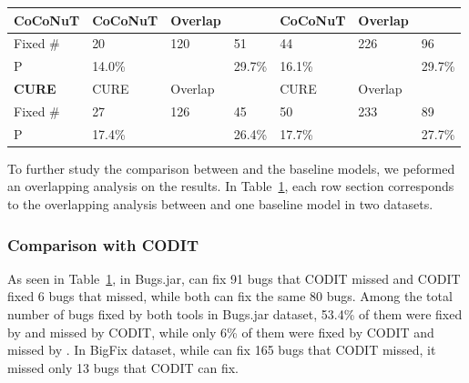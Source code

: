 {{\begin{table}[t]
\begin{center}
\begin{tabular}{p{1cm}<{\centering}|p{1.1cm}<{\centering}|p{0.8cm}<{\centering}|p{0.7cm}<{\centering}|p{1.1cm}<{\centering}|p{0.8cm}<{\centering}|p{0.7cm}<{\centering}}
			\hline
			{\bf CoCoNuT}             & CoCoNuT   & Overlap   & \tool  & CoCoNuT   & Overlap   & \tool \\
			\hline
			Fixed \#     & \cellcolor{mygray} 20  & 120   & \cellcolor{mygray} 51 & \cellcolor{mygray}44 &  226  & \cellcolor{mygray} 96\\
			P            &  14.0\%  &    &  29.7\% &  16.1\%  &    & 29.7\% \\
			\hline
			{\bf CURE}             & CURE   & Overlap   & \tool  & CURE   & Overlap   & \tool \\
			\hline
			Fixed \#     & \cellcolor{mygray} 27  &  126  & \cellcolor{mygray} 45 & \cellcolor{mygray} 50&  233  & \cellcolor{mygray} 89\\
			P            &  17.4\%  &    & 26.4\%  & 17.7\%   &    &  27.7\%\\
			\hline
		\end{tabular}
		\label{RQ3_results}
	\end{center}
\end{table}
}}

To further study the comparison between {\tool} and the baseline
models, we peformed an overlapping analysis on the results.  In
Table~\ref{RQ3_results}, each row section corresponds to the
overlapping analysis between {\tool} and one baseline model
in two datasets.

\subsubsection{{\bf Comparison with CODIT}}

As seen in Table~\ref{RQ3_results}, in Bugs.jar, {\tool} can fix 91
bugs that CODIT missed and CODIT fixed 6 bugs that {\tool} missed,
while both can fix the same 80 bugs. Among the total number of bugs
fixed by both tools in Bugs.jar dataset, 53.4\% of them were fixed by
{\tool} and missed by CODIT, while only 6\% of them were fixed by
CODIT and missed by {\tool}. In BigFix dataset, while {\tool} can fix
165 bugs that CODIT missed, it missed only 13 bugs that CODIT can fix.

